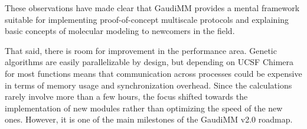 These observations have made clear that GaudiMM provides a mental framework suitable for implementing proof-of-concept multiscale protocols and explaining basic concepts of molecular modeling to newcomers in the field.

That said, there is room for improvement in the performance area. Genetic algorithms are easily parallelizable by design, but depending on UCSF Chimera for most functions means that communication across processes could be expensive in terms of memory usage and synchronization overhead. Since the calculations rarely involve more than a few hours, the focus shifted towards the implementation of new modules rather than optimizing the speed of the new ones. However, it is one of the main milestones of the GaudiMM v2.0 roadmap.
